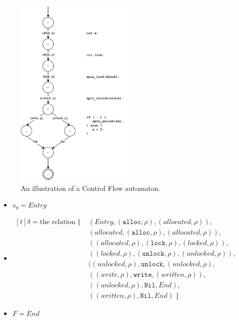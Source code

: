 \begin{figure}[H]
    \centering
    \includegraphics[width=0.5\textwidth]{algorithm/figures/cfg_example}
    \caption{An illustration of a Control Flow automaton.}
    \label{cfg_example-automaton}
\end{figure}

\begin{itemize}
    \item $s_0 = Entry$ 
    \item {
        $
            \begin{aligned}[t]
            \delta = \text{the relation} \; \{ \; & (Entry, (\texttt{alloc},\rho), (allocated, \rho)), \\ 
            & (allocated, (\texttt{alloc},\rho), (allocated, \rho)), \\ 
            & ((allocated, \rho), (\texttt{lock}, \rho), (locked, \rho)), \\
            & ((locked, \rho), (\texttt{unlock}, \rho), (unlocked, \rho)), \\
            & ((unlocked, \rho), \texttt{unlock}, (unlocked, \rho), \\ 
            & ((write, \rho), \texttt{write}, (written, \rho)), \\ 
            & ((unlocked, \rho), \texttt{Nil}, End), \\ 
            & ((written, \rho), \texttt{Nil}, End) \; \}
            \end{aligned}
        $ 
    }
    \item $F = End$
\end{itemize}

